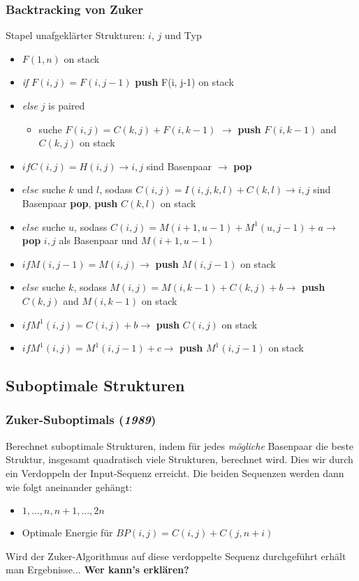 \subsubsection{Backtracking von Zuker}
Stapel unafgekl\"arter Strukturen: $i$, $j$ und Typ
\begin{itemize}
\item[]$F(1,n)$ on stack
\item[]\textit{if} $F(i,j)=F(i, j-1)$ \textbf{push} F(i, j-1) on stack
\item[]\textit{else} $j$ is paired
	\begin{itemize}
	\item[]suche $F(i, j)=C(k,j) + F(i,k-1)$ $\rightarrow$ \textbf{push} $F(i, k-1)$ and $C(k, j)$ on stack
	\end{itemize}
\item[]$if C(i,j)=H(i,j) \rightarrow i, j$ sind Basenpaar $\rightarrow$ \textbf{pop}
\item[]$else$ suche $k$ und $l$, sodass $C(i,j) = I(i,j,k, l) + C(k,l) \rightarrow  i, j$ sind Basenpaar \textbf{pop}, \textbf{push} $C(k,l)$ on stack
\item[]$else$ suche $u$, sodass $C(i,j)=M(i+1,u-1)+M^1(u,j-1)+a  \rightarrow$ \textbf{pop}  $i, j$ als Basenpaar und $M(i+1,u-1)$
\item[]$if M(i,j-1)=M(i,j) \rightarrow$ \textbf{push} $M(i,j-1)$ on stack
\item[]$else$ suche $k$, sodass $M(i,j)=M(i, k-1)+C(k,j)+b \rightarrow$ \textbf{push} $C(k,j)$ and $M(i,k-1)$ on stack
\item[]$if M^1(i,j) = C(i,j)+b \rightarrow$ \textbf{push} $C(i,j)$ on stack
\item[]$if  M^1(i,j) = M^1(i,j-1)+c \rightarrow$ \textbf{push} $M^1(i,j-1)$ on stack
\end{itemize}


\subsection{Suboptimale Strukturen}

\subsubsection{ Zuker-Suboptimals (\textit{1989})}
Berechnet suboptimale Strukturen, indem für jedes \textit{m\"ogliche} Basenpaar die beste Struktur, insgesamt quadratisch viele Strukturen, berechnet wird. Dies wir durch ein Verdoppeln der Input-Sequenz erreicht. Die beiden Sequenzen werden dann wie folgt aneinander geh\"angt:
\begin{itemize}
\item[]$1, .. .,n, n+1, ..., 2n$
\item[]Optimale Energie f\"ur $BP(i,j)=C(i,j)+C(j, n+i)$
\end{itemize}
Wird der Zuker-Algorithmus auf diese verdoppelte Sequenz durchgef\"uhrt erh\"alt man Ergebnisse...\textbf{ Wer kann's erkl\"aren?}

